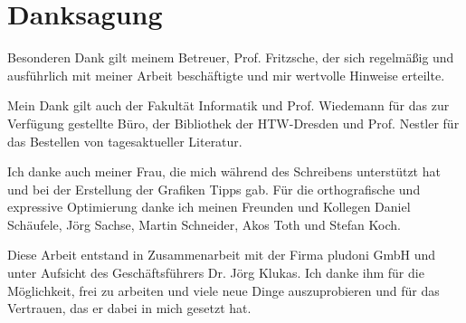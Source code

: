 \chapter*{Danksagung}

Besonderen Dank gilt meinem Betreuer, Prof. Fritzsche, der sich regelmäßig und ausführlich mit meiner Arbeit beschäftigte und mir wertvolle Hinweise erteilte.

Mein Dank gilt auch der Fakultät Informatik und Prof. Wiedemann für das zur Verfügung gestellte Büro, der Bibliothek der HTW-Dresden und Prof. Nestler für das Bestellen von tagesaktueller Literatur.

Ich danke auch meiner Frau, die mich während des Schreibens unterstützt hat und bei der Erstellung der Grafiken Tipps gab. Für die orthografische und expressive Optimierung danke ich meinen Freunden und Kollegen Daniel Schäufele, Jörg Sachse, Martin Schneider, Akos Toth und Stefan Koch.

Diese Arbeit entstand in Zusammenarbeit mit der Firma pludoni GmbH und unter Aufsicht des Geschäftsführers Dr. Jörg Klukas. Ich danke ihm für die Möglichkeit, frei zu arbeiten und viele neue Dinge auszuprobieren und für das Vertrauen, das er dabei in mich gesetzt hat.

